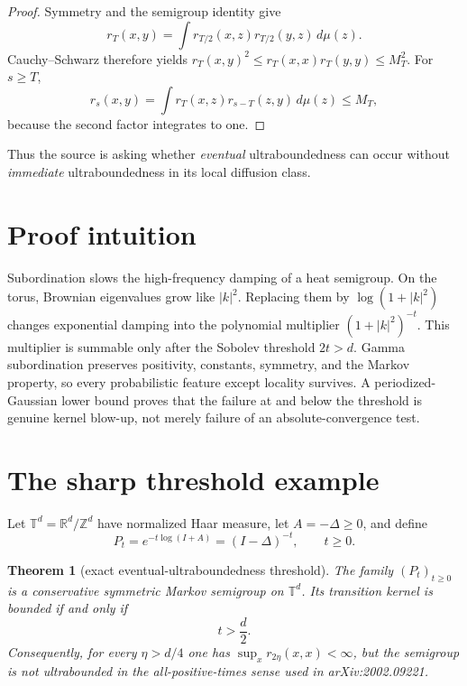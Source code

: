 \documentclass[11pt]{article}
\newtheorem{theorem}{Theorem}
\theoremstyle{remark}
\newcommand{\T}{\mathbb T}
\newcommand{\Z}{\mathbb Z}
\newcommand{\R}{\mathbb R}
\begin{document}
\begin{proof}
Symmetry and the semigroup identity give
\[
 r_T(x,y)=\int r_{T/2}(x,z)r_{T/2}(y,z)\,d\mu(z).
\]
Cauchy--Schwarz therefore yields
$r_T(x,y)^2\leq r_T(x,x)r_T(y,y)\leq M_T^2$.  For $s\geq T$,
\[
 r_s(x,y)=\int r_T(x,z)r_{s-T}(z,y)\,d\mu(z)\leq M_T,
\]
because the second factor integrates to one.
\end{proof}

Thus the source is asking whether \emph{eventual} ultraboundedness can occur
without \emph{immediate} ultraboundedness in its local diffusion class.

\section{Proof intuition}

Subordination slows the high-frequency damping of a heat semigroup.  On the
torus, Brownian eigenvalues grow like $|k|^2$.  Replacing them by
$\log(1+|k|^2)$ changes exponential damping into the polynomial multiplier
$(1+|k|^2)^{-t}$.  This multiplier is summable only after the Sobolev
threshold $2t>d$.  Gamma subordination preserves positivity, constants,
symmetry, and the Markov property, so every probabilistic feature except
locality survives.  A periodized-Gaussian lower bound proves that the failure
at and below the threshold is genuine kernel blow-up, not merely failure of
an absolute-convergence test.

\section{The sharp threshold example}

Let $\T^d=\R^d/\Z^d$ have normalized Haar measure, let
$A=-\Delta\geq0$, and define
\[
 P_t=e^{-t\log(I+A)}=(I-\Delta)^{-t},\qquad t\geq0.
\]

\begin{theorem}[exact eventual-ultraboundedness threshold]\label{thm:main}
The family $(P_t)_{t\geq0}$ is a conservative symmetric Markov semigroup on
$\T^d$.  Its transition kernel is bounded if and only if
\[
 t>\frac d2.
\]
Consequently, for every $\eta>d/4$ one has
$\sup_x r_{2\eta}(x,x)<\infty$, but the semigroup is not ultrabounded in the
all-positive-times sense used in arXiv:2002.09221.
\end{theorem}
\end{document}
